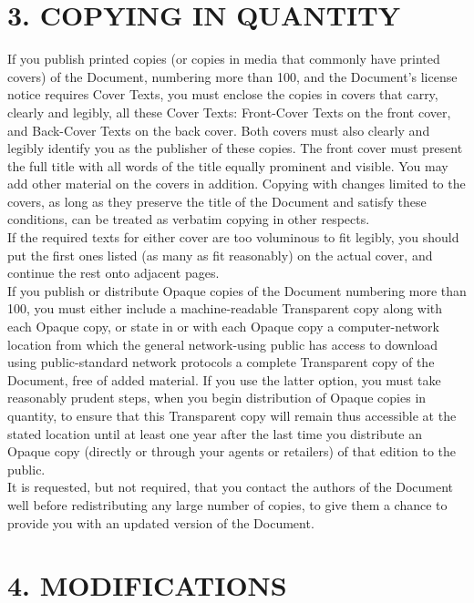 \section{3. COPYING IN QUANTITY}



If you publish printed copies (or copies in media that commonly have printed covers) of the Document, numbering more than 100, and the Document's license notice requires Cover Texts, you must enclose the copies in covers that carry, clearly and legibly, all these Cover Texts: Front-Cover Texts on the front cover, and Back-Cover Texts on the back cover. Both covers must also clearly and legibly identify you as the publisher of these copies. The front cover must present the full title with all words of the title equally prominent and visible. You may add other material on the covers in addition. Copying with changes limited to the covers, as long as they preserve the title of the Document and satisfy these conditions, can be treated as verbatim copying in other respects.\\
If the required texts for either cover are too voluminous to fit legibly, you should put the first ones listed (as many as fit reasonably) on the actual cover, and continue the rest onto adjacent pages.\\
If you publish or distribute Opaque copies of the Document numbering more than 100, you must either include a machine-readable Transparent copy along with each Opaque copy, or state in or with each Opaque copy a computer-network location from which the general network-using public has access to download using public-standard network protocols a complete Transparent copy of the Document, free of added material. If you use the latter option, you must take reasonably prudent steps, when you begin distribution of Opaque copies in quantity, to ensure that this Transparent copy will remain thus accessible at the stated location until at least one year after the last time you distribute an Opaque copy (directly or through your agents or retailers) of that edition to the public.\\
It is requested, but not required, that you contact the authors of the Document well before redistributing any large number of copies, to give them a chance to provide you with an updated version of the Document.

\section{4. MODIFICATIONS}





